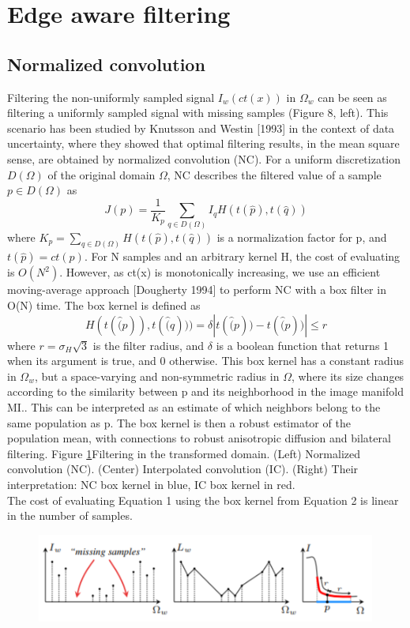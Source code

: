 \documentclass[conference]{IEEEtran}
\begin{document}
 \section{Edge aware filtering}
 \subsection{Normalized convolution}
Filtering the non-uniformly sampled signal $I_w(ct(x))$ in $\Omega_w$ can be seen as filtering a uniformly sampled signal with missing samples (Figure 8, left). This scenario has been studied by Knutsson and Westin [1993] in the context of data uncertainty, where they showed that optimal filtering results, in the mean square sense, are obtained by normalized convolution (NC). For a uniform discretization $D(\Omega)$ of the original domain $\Omega$, NC describes the filtered value of a sample $p \in D(\Omega)$ as
$$J(p) = \frac{1}{K_p}\sum_{q \in D(\Omega)}I_qH(t(\hat{p}),t(\hat{q}))$$
where $K_p = \sum_{q \in D(\Omega)}H(t(\hat{p}),t(\hat{q}))$  is a normalization factor for p, and $t(\hat{p}) = ct(p)$. For N samples and an arbitrary kernel H, the cost of evaluating is $O(N^2 )$. However, as ct(x) is monotonically increasing, we use an efficient moving-average approach [Dougherty 1994] to perform NC with a box filter in O(N) time. The box kernel is defined as
$$H(t(\hat(p)),t(\hat(q))) = \delta{|t(\hat(p)) - t(\hat(p))| \leq r}$$ 
where $r = \sigma_H \sqrt{ 3}$ is the filter radius, and $\delta$ is a boolean function that returns 1 when its argument is true, and 0 otherwise. This box kernel has a constant radius in $\Omega_w$, but a space-varying and non-symmetric radius in $\Omega$, where its size changes according to the similarity between p and its neighborhood in the image manifold MI.. This can be interpreted as an estimate of which neighbors belong to the same population as p. The box kernel is then a robust estimator of the population mean, with connections to robust anisotropic diffusion and bilateral filtering.
 Figure \ref{fig:NC_sample}Filtering in the transformed domain. (Left) Normalized convolution (NC). (Center) Interpolated convolution (IC). (Right) Their interpretation: NC box kernel in blue, IC box kernel in red.\\
 The cost of evaluating Equation 1 using the box kernel from Equation 2 is linear in the number of samples. 
 
 \begin{figure}
 	\includegraphics[width = \linewidth]{NC_sample.png}
 	\label{fig:NC_sample}
 \end{figure}
 
\end{document}
